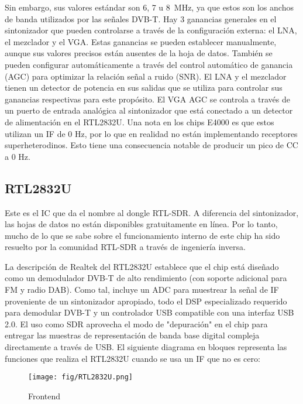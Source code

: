 Sin embargo, sus valores estándar son \SI{6}{}, \SI{7}{} u \SI{8}{MHz}, ya que estos son los anchos de banda utilizados por las señales DVB-T. 
Hay 3 ganancias generales en el sintonizador que pueden controlarse a través de la configuración externa: el LNA, el mezclador y el VGA. 
Estas ganancias se pueden establecer manualmente, aunque sus valores precisos están ausentes de la hoja de datos. 
También se pueden configurar automáticamente a través del control automático de ganancia (AGC) para optimizar la relación señal a ruido (SNR). 
El LNA y el mezclador tienen un detector de potencia en sus salidas que se utiliza para controlar sus ganancias respectivas para este propósito. 
El VGA AGC se controla a través de un puerto de entrada analógica al sintonizador que está conectado a un detector de alimentación en el RTL2832U.
Una nota en los chips E4000 es que estos utilizan un IF de 0 Hz, por lo que en realidad no están implementando receptores superheterodinos. Esto tiene una consecuencia notable de producir un pico de CC a 0 Hz.

\subsection{RTL2832U}

Este es el IC que da el nombre al dongle RTL-SDR. A diferencia del sintonizador, las hojas de datos no están disponibles gratuitamente en línea. 
Por lo tanto, mucho de lo que se sabe sobre el funcionamiento interno de este chip ha sido resuelto por la comunidad RTL-SDR a través de ingeniería inversa. 

La descripción de Realtek del RTL2832U establece que el chip está diseñado como un demodulador DVB-T de alto rendimiento (con soporte adicional para FM y radio DAB). Como tal, incluye un ADC para muestrear la señal de IF proveniente de un sintonizador apropiado, todo el DSP especializado requerido para demodular DVB-T y un controlador USB compatible con una interfaz USB 2.0. El uso como SDR aprovecha el modo de "depuración" en el chip para entregar las muestras de representación de banda base digital compleja directamente a través de USB.
El siguiente diagrama en bloques representa las funciones que realiza el RTL2832U cuando se usa un IF que no es cero:
  
\begin{figure}[h!]
\centering
\texttt{[image: fig/RTL2832U.png]}
\caption{Frontend}
\label{fig:frontend}
\end{figure}

